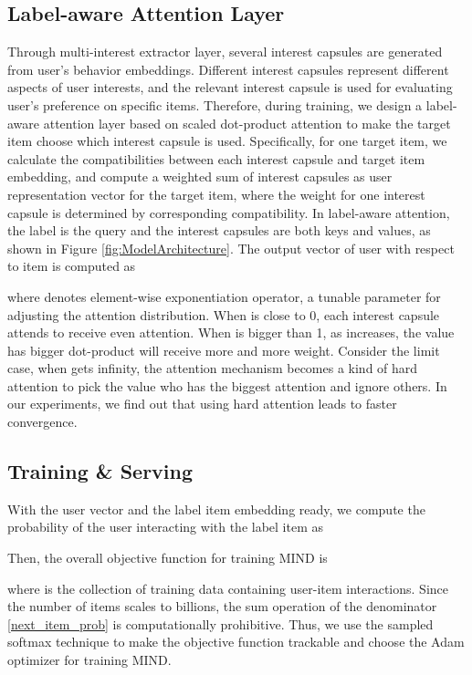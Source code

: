 \documentclass[sigconf]{acmart}
\begin{document}
\subsection{Label-aware Attention Layer}
Through multi-interest extractor layer, several interest capsules are generated from user's behavior embeddings.
Different interest capsules represent different aspects of user interests, and the relevant interest capsule is used for evaluating user's preference on specific items.
Therefore, during training, we design a label-aware attention layer based on scaled dot-product attention \cite{vaswani2017attention} to make the target item choose which interest capsule is used.
Specifically, for one target item, we calculate the compatibilities between each interest capsule and target item embedding, and compute a weighted sum of interest capsules as user representation vector for the target item, where the weight for one interest capsule is determined by corresponding compatibility.
In label-aware attention, the label is the query and the interest capsules are both keys and values, as shown in Figure \ref{fig:ModelArchitecture}.
The output vector of user  with respect to item  is computed as

where  denotes element-wise exponentiation operator,  a tunable parameter for adjusting the attention distribution.
When  is close to 0, each interest capsule attends to receive even attention.
When  is bigger than 1, as  increases, the value has bigger dot-product will receive more and more weight.
Consider the limit case, when  gets infinity, the attention mechanism becomes a kind of hard attention to pick the value who has the biggest attention and ignore others.
In our experiments, we find out that using hard attention leads to faster convergence.

\subsection{Training \& Serving}
With the user vector  and the label item embedding  ready, we compute the probability of the user  interacting with the label item  as

Then, the overall objective function for training MIND is

where  is the collection of training data containing user-item interactions.
Since the number of items scales to billions, the sum operation of the denominator \eqref{next_item_prob} is computationally prohibitive.
Thus, we use the sampled softmax technique \cite{covington2016deep} to make the objective function trackable and choose the Adam optimizer \cite{kingma2014adam} for training MIND.
\end{document}
